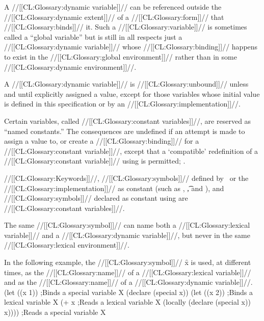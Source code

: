 A //[[CL:Glossary:dynamic variable]]// can be referenced outside the //[[CL:Glossary:dynamic extent]]// of a //[[CL:Glossary:form]]// that //[[CL:Glossary:binds]]// it.  Such a //[[CL:Glossary:variable]]// is sometimes called  a ``global variable'' but is still in all respects just a //[[CL:Glossary:dynamic variable]]// whose //[[CL:Glossary:binding]]// happens to exist in the //[[CL:Glossary:global environment]]// rather than in some //[[CL:Glossary:dynamic environment]]//.

A //[[CL:Glossary:dynamic variable]]// is //[[CL:Glossary:unbound]]// unless and until explicitly assigned a value, except for  those variables whose initial value is  defined in this specification or by an //[[CL:Glossary:implementation]]//.

\endsubsubsubsubsection%

 

Certain variables, called //[[CL:Glossary:constant variables]]//, are reserved as ``named constants.''   The consequences are undefined if an attempt is made to 
    assign a value to,
 or create a //[[CL:Glossary:binding]]// for a //[[CL:Glossary:constant variable]]//,  except that a `compatible' redefinition of a //[[CL:Glossary:constant variable]]// using  is permitted; .

//[[CL:Glossary:Keywords]]//,  //[[CL:Glossary:symbols]]// defined by \clisp\ or the //[[CL:Glossary:implementation]]//
  as constant (such as \nil, \t, and ), and //[[CL:Glossary:symbols]]// declared as constant using  are //[[CL:Glossary:constant variables]]//.

\endsubsubsubsubsection%


The same //[[CL:Glossary:symbol]]// can name both 
    a //[[CL:Glossary:lexical variable]]//  and a //[[CL:Glossary:dynamic variable]]//, but never in the same //[[CL:Glossary:lexical environment]]//.

In the following example, the //[[CL:Glossary:symbol]]// \f{x} is used, at different times, 
    as the //[[CL:Glossary:name]]// of a //[[CL:Glossary:lexical variable]]// and as the //[[CL:Glossary:name]]// of a //[[CL:Glossary:dynamic variable]]//.
  \code
 (let ((x 1))            ;Binds a special variable X
   (declare (special x))
   (let ((x 2))          ;Binds a lexical variable X
     (+ x                ;Reads a lexical variable X
        (locally (declare (special x))
                 x))))   ;Reads a special variable X  \endcode


